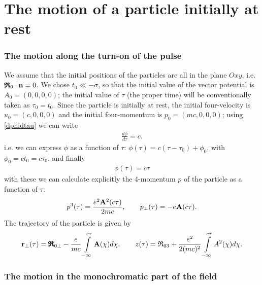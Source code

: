 \section{The motion of a particle initially at rest}


\subsubsection{The motion along the turn-on of the pulse}
We assume that the initial positions of the particles are all in the plane \(Oxy\), i.e. \({\pmb{\mathfrak R}}_0\cdot{\bf n}=0\). We chose \(t_0 \ll -\sigma\), so that the initial value of the vector potential is \(A_0=(0,0,0,0)\); the initial value of \(\tau\) (the proper time) will be conventionally taken as \(\tau_0 = t_0\).
Since the particle is initially at rest, the initial four-velocity is \(u_0 = (c,0,0,0)\) and the initial four-momentum is \(p_0 = (mc,0,0,0)\); using \eqref{dphidtau} we can write
\begin{align}
    \frac{d\phi}{d\tau} = c.
\end{align}
i.e. we can express \(\phi\) as a function of \(\tau\): \(\phi(\tau) = c(\tau-\tau_0)+\phi_0\), with \(\phi_0 = ct_0 = c\tau_0\), and finally
\begin{align}
    \phi(\tau) = c\tau
\end{align}
with these we can calculate explicitly the 4-momentum \(p\) of the particle as a function of \(\tau\):
\begin{align}
    p^3(\tau) = \frac{e^2 {\bf A}^2(c\tau)}{2mc}, \qquad p_{\perp}(\tau) = -e {\bf A}(c\tau).
\end{align}
The trajectory of the particle is given by
\begin{align}
    {\bf r}_{\perp}(\tau) = \pmb{\mathfrak{R}}_{0\perp}-\frac{e}{mc} \int\limits_{-\infty}^{c\tau} {\bf A}(\chi) d\chi, \qquad z(\tau) ={\mathfrak{R}}_{03}+ \frac{e^2}{2(mc)^2} \int\limits_{-\infty}^{c\tau} A^2(\chi) d\chi.
\end{align}

\subsubsection{The motion in the monochromatic part of the field}


